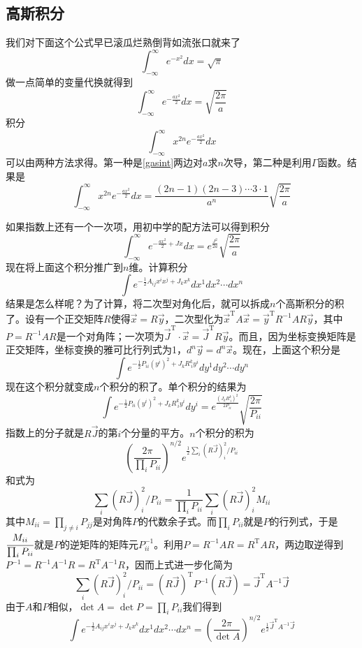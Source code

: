 \documentclass[a4paper,11pt]{ctexart}
\newcommand{\beq}{\begin{equation}}
\newcommand{\eeq}{\end{equation}}
\begin{document}
\subsection{高斯积分}
我们对下面这个公式早已滚瓜烂熟倒背如流张口就来了
\beq
\int_{-\infty}^{\infty} e^{-x^2} dx = \sqrt{\pi}
\eeq
做一点简单的变量代换就得到
\beq \label{gasint}
\int_{-\infty}^{\infty} e^{-\frac{ax^2}{2}} dx = \sqrt{\frac{2\pi}{a}}
\eeq
积分$$
\int_{-\infty}^{\infty} x^{2n} e^{-\frac{ax^2}{2}}dx
$$
可以由两种方法求得。第一种是\cref{gasint}两边对$a$求$n$次导，第二种是利用$\Gamma$函数。结果是
\beq
\int_{-\infty}^{\infty} x^{2n} e^{-\frac{ax^2}{2}}dx = \frac{(2n-1)(2n-3)\cdots 3\cdot 1}{a^n} \sqrt{\frac{2\pi}{a}}
\eeq
\par
如果指数上还有一个一次项，用初中学的配方法可以得到积分
\beq
\int_{-\infty}^{\infty} e^{-\frac{ax^2}{2} + Jx} dx = e^{\frac{J^2}{2a}} \sqrt{\frac{2\pi}{a}}
\eeq
现在将上面这个积分推广到$n$维。计算积分
$$ \int e^{- \frac{1}{2} A_{ij} x^i x^j + J_k x^k} dx^1 dx^2 \cdots dx^n$$
结果是怎么样呢？为了计算，将二次型对角化后，就可以拆成$n$个高斯积分的积了。设有一个正交矩阵$R$使得$\vec{x} = R\vec{y}$，二次型化为$\vec{x}^\mathrm{T} A \vec{x} = \vec{y}^\mathrm{T} R^{-1} A R \vec{y}$，其中$P = R^{-1} A R$是一个对角阵；一次项为$\vec{J}^\mathrm{T} \cdot \vec{x} = \vec{J}^\mathrm{T} R \vec{y}$。而且，因为坐标变换矩阵是正交矩阵，坐标变换的雅可比行列式为1，$d^n \vec{y} = d^n \vec{x}$。现在，上面这个积分是
\beq
\int e^{ - \frac{1}{2} P_{ii} (y^i)^2 + J_k R^k_{\ i} y^i} dy^1 dy^2 \cdots dy^n
\eeq
现在这个积分就变成$n$个积分的积了。单个积分的结果为
\beq
\int e^{ - \frac{1}{2} P_{ii} (y^i)^2 + J_k R^k_{\ i} y^i} dy^i = e^{\frac{(J_k R^k_{\ i})^2}{2P_{ii}}} \sqrt{\frac{2\pi}{P_{ii}}}
\eeq
指数上的分子就是$R\vec{J}$的第$i$个分量的平方。$n$个积分的积为
\beq
(\frac{2\pi}{\prod_i P_{ii}})^{n/2} e^{\frac{1}{2} \sum_i (R\vec{J})_i^2 / P_{ii}}
\eeq
和式为
\beq
\sum_i (R\vec{J})_i^2 / P_{ii}
=\frac{1}{\prod_i P_{ii}} \sum_i (R\vec{J})_i^2 M_{ii}
\eeq
其中$M_{ii} = \prod_{j \not= i} P_{jj}$是对角阵$P$的代数余子式。而$\prod_i P_{ii}$就是$P$的行列式，于是$\cfrac{M_{ii}}{\prod_i P_{ii}}$就是$P$的逆矩阵的矩阵元$P^{-1}_{ii}$。利用$P=R^{-1} A R = R^\mathrm{T} A R$，两边取逆得到$P^{-1} = R^{-1} A^{-1} R = R^\mathrm{T} A^{-1} R$，因而上式进一步化简为
\beq
\sum_i (R\vec{J})_i^2 / P_{ii} = (R \vec{J})^\mathrm{T} P^{-1} (R \vec{J}) = \vec{J}^\mathrm{T} A^{-1} \vec{J}
\eeq
由于$A$和$P$相似，$\det A = \det P =\prod_i P_{ii}$我们得到
\beq
\int e^{- \frac{1}{2} A_{ij} x^i x^j + J_k x^k} dx^1 dx^2 \cdots dx^n = (\frac{2\pi}{\det A})^{n/2} e^{\frac{1}{2} {\vec{J}}^\mathrm{T} A^{-1} \vec{J}}
\eeq
\end{document}
